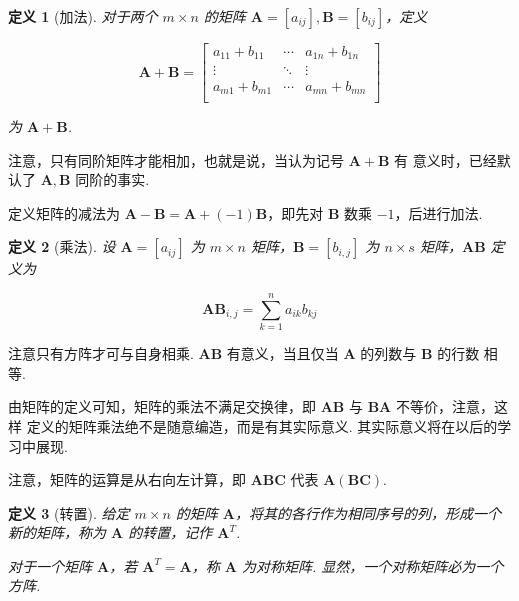 \documentclass[a4paper]{article}
\newtheorem{definition}{定义}[section]
\begin{document}
\begin{definition}[加法]
    对于两个 $m\times n$ 的矩阵 $\boldsymbol A=[a_{ij}],\boldsymbol B=[b_{ij}]$，定义

    \begin{equation*}
        \boldsymbol A+\boldsymbol B=\begin{bmatrix}
            a_{11}+b_{11} & \cdots & a_{1n}+b_{1n} \\
            \vdots        & \ddots & \vdots        \\
            a_{m1}+b_{m1} & \cdots & a_{mn}+b_{mn} \\
        \end{bmatrix}
    \end{equation*}

    为 $\boldsymbol A+\boldsymbol B$.
\end{definition}

注意，只有同阶矩阵才能相加，也就是说，当认为记号 $\boldsymbol A+\boldsymbol B$ 有
意义时，已经默认了 $\boldsymbol A,\boldsymbol B$ 同阶的事实.

定义矩阵的减法为 $\boldsymbol A-\boldsymbol B=\boldsymbol A+(-1)\boldsymbol B
$，即先对 $\boldsymbol B$ 数乘 $-1$，后进行加法.

\begin{definition}[乘法]
    设 $\boldsymbol A=[a_{ij}]$ 为 $m\times n$ 矩阵，$\boldsymbol B=[b_{i,j}]$ 为 $n\times s$ 矩阵，$\boldsymbol A\boldsymbol
        B$ 定义为

    \begin{equation*}
        \boldsymbol A\boldsymbol B_{i,j}=\sum\limits_{k=1}^n a_{ik}b_{kj}
    \end{equation*}
\end{definition}

注意只有方阵才可与自身相乘. $\boldsymbol A\boldsymbol B$ 有意义，当且仅当 $\boldsymbol A$ 的列数与 $\boldsymbol B$ 的行数
相等.

由矩阵的定义可知，矩阵的乘法不满足交换律，即 $\boldsymbol A\boldsymbol B$ 与 $\boldsymbol B\boldsymbol A$ 不等价，注意，这样
定义的矩阵乘法绝不是随意编造，而是有其实际意义. 其实际意义将在以后的学习中展现. 

注意，矩阵的运算是从右向左计算，即 $\boldsymbol A\boldsymbol B\boldsymbol C$ 代表 $\boldsymbol A(\boldsymbol B \boldsymbol C)$.

\begin{definition}[转置]
    给定 $m\times n$ 的矩阵 $\boldsymbol A$，将其的各行作为相同序号的列，形成一个新的矩阵，称为 $\boldsymbol A$ 的转置，记作 $\boldsymbol A^T$. 

    对于一个矩阵 $\boldsymbol A$，若 $\boldsymbol A^T=\boldsymbol A$，称 $\boldsymbol A$ 为对称矩阵. 显然，一个对称矩阵必为一个方阵. 
\end{definition}
\end{document}
